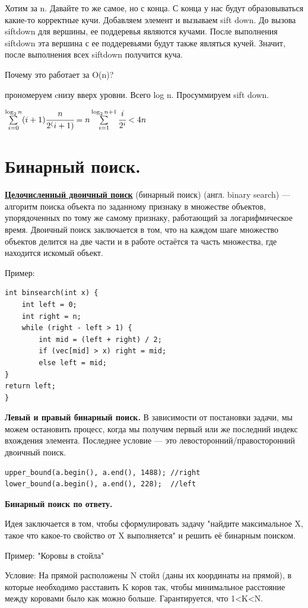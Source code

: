\documentclass{article}
\newcommand{\deff}[1]{\underline{\textbf{#1}}}
\begin{document}
Хотим за n. Давайте то же самое, но с конца. С конца у нас будут образовываться какие-то корректные кучи. Добавляем элемент и вызываем sift down. До вызова siftdown для вершины, ее поддеревья являются кучами. После выполнения siftdown эта вершина с ее поддеревьями будут также являться кучей. Значит, после выполнения всех siftdown получится куча.

Почему это работает за O(n)?

прономеруем cнизу вверх уровни. Всего log n. Просуммируем sift down.

$\sum \limits_{i=0}^{\log_2 n}(i+1)\cfrac{n}{2^(i+1)} =n\sum \limits_{i=1}^{\log_2 n+1} \cfrac{i}{2^i}<4n$

\pagebreak
\section{Бинарный поиск.}
\deff{Целочисленный двоичный поиск} (бинарный поиск) (англ. binary search) — алгоритм поиска объекта по заданному признаку в множестве объектов, упорядоченных по тому же самому признаку, работающий за логарифмическое время. Двоичный поиск заключается в том, что на каждом шаге множество объектов делится на две части и в работе остаётся та часть множества, где находится искомый объект.

Пример:

\begin{lstlisting}[mathescape]
int binsearch(int x) {
	int left = 0;
	int right = n; 
	while (right - left > 1) {
		int mid = (left + right) / 2;
		if (vec[mid] > x) right = mid;
		else left = mid;
}
return left;
}\end{lstlisting}

\textbf{Левый и правый бинарный поиск.}
В зависимости от постановки задачи, мы можем остановить процесс, когда мы получим первый или же последний индекс вхождения элемента. Последнее условие — это левосторонний/правосторонний двоичный поиск.
\begin{lstlisting}[mathescape]
upper_bound(a.begin(), a.end(), 1488); //right
lower_bound(a.begin(), a.end(), 228);  //left
\end{lstlisting}
\textbf{Бинарный поиск по ответу.}

Идея заключается в том, чтобы сформулировать задачу "найдите максимальное X, такое что какое-то свойство от X выполняется" и решить её бинарным поиском.

Пример: "Коровы в стойла"

Условие: На прямой расположены N стойл (даны их координаты на прямой), в которые необходимо расставить K коров так, чтобы минимальное расстояние между коровами было как можно больше. Гарантируется, что 1<K<N.
\end{document}
